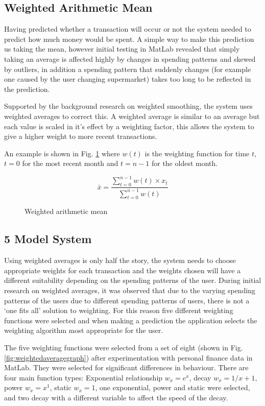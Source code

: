 \subsection{Weighted Arithmetic Mean}
Having predicted whether a transaction will occur or not the system needed to predict how much money would be spent. A simple way to make this prediction us taking the mean, however initial testing in MatLab revealed that simply taking an average is affected highly by changes in spending patterns and skewed by outliers, in addition a spending pattern that suddenly changes (for example one caused by the user changing supermarket) takes too long to be reflected in the prediction.

Supported by the background research on weighted smoothing, the system uses weighted averages to correct this. A weighted average is similar to an average but each value is scaled in it's effect by a weighting factor, this allows the system to give a higher weight to more recent transactions.

An example is shown in Fig. \ref{fig:weighting} where $w(t)$ is the weighting function for time $t$, $t = 0$ for the most recent month and $t = n - 1$ for the oldest month. 

\begin{figure}[h]
    \centering
    \[
        \bar{x} = 
        \frac{
                \sum\limits^{n-1}_{t=0}{w(t) \times x_t}
            }{
                \sum\limits_{t=0}^{n-1}{w(t)}
        } 
    \]
    \caption{Weighted arithmetic mean}
    \label{fig:weighting}
\end{figure}

\subsection{5 Model System}
Using weighted averages is only half the story, the system needs to choose appropriate weights for each transaction and the weights chosen will have a different suitability depending on the spending patterns of the user.
% 
During initial research on weighted averages, it was observed that due to the varying spending patterns of the users due to different spending patterns of users, there is not a `one fits all' solution to weighting.
%
For this reason five different weighting functions were selected and when making a prediction the application selects the weighting algorithm most appropriate for the user.

The five weighting functions were selected from a set of eight (shown in Fig. \ref{fig:weightedaveragegraph}) after experimentation with personal finance data in MatLab. They were selected for significant differences in behaviour.
%
There are four main function types: Exponential relationship $w_x = e^{x}$, decay $w_x = {1}/{x + 1}$, power $w_x = x^1 $, static $w_x = 1$, one exponential, power and static were selected, and two decay with a different variable to affect the speed of the decay. 

